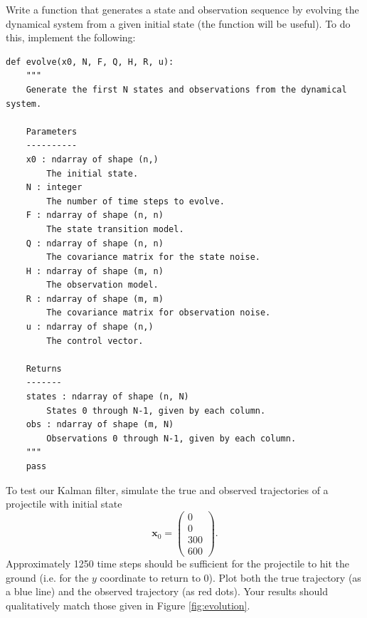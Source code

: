 \begin{problem}
Write a function that generates a state and observation sequence by evolving the dynamical system from a given initial state (the function  will be useful).
To do this, implement the following:
\begin{lstlisting}
def evolve(x0, N, F, Q, H, R, u):
    """
    Generate the first N states and observations from the dynamical system.

    Parameters
    ----------
    x0 : ndarray of shape (n,)
        The initial state.
    N : integer
        The number of time steps to evolve.
    F : ndarray of shape (n, n)
        The state transition model.
    Q : ndarray of shape (n, n)
        The covariance matrix for the state noise.
    H : ndarray of shape (m, n)
        The observation model.
    R : ndarray of shape (m, m)
        The covariance matrix for observation noise.
    u : ndarray of shape (n,)
        The control vector.

    Returns
    -------
    states : ndarray of shape (n, N)
        States 0 through N-1, given by each column.
    obs : ndarray of shape (m, N)
        Observations 0 through N-1, given by each column.
    """
    pass
\end{lstlisting}

\noindent To test our Kalman filter, simulate the true and observed trajectories of a projectile with initial state
\begin{equation*}
    \mathbf{x}_0 = \left( \begin{array}{c} 0\\ 0 \\ 300 \\ 600\end{array} \right).
\end{equation*}
Approximately 1250 time steps should be sufficient for the projectile to hit the ground (i.e. for the $y$ coordinate to return to 0).
Plot both the true trajectory (as a blue line) and the observed trajectory (as red dots).
Your results should qualitatively match those given in Figure \ref{fig:evolution}.
\label{prob:simulation}
\end{problem}


